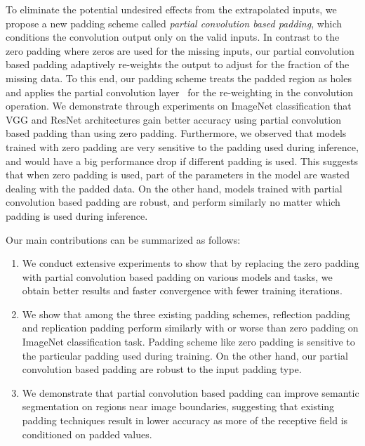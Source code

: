 \documentclass[10pt,twocolumn,letterpaper]{article}
\begin{document}
To eliminate the potential undesired effects from the extrapolated inputs, we propose a new padding scheme called \textit{partial convolution based padding}, which conditions the convolution output only on the valid inputs. In contrast to the zero padding where zeros are used for the missing inputs, our partial convolution based padding adaptively re-weights the output to adjust for the fraction of the missing data. To this end, our padding scheme treats the padded region as holes and applies the partial convolution layer~\cite{liu2018image} for the re-weighting in the convolution operation. We demonstrate through experiments on ImageNet classification that VGG and ResNet architectures gain better accuracy using partial convolution based padding than using zero padding.
Furthermore, we observed that models trained with zero padding are very sensitive to the padding used during inference, and would have a big performance drop if different padding is used. This suggests that when zero padding is used, part of the parameters in the model are wasted dealing with the padded data. On the other hand, models trained with partial convolution based padding are robust, and perform similarly no matter which padding is used during inference.

Our main contributions can be summarized as follows: 
\begin{enumerate}
\item We conduct extensive experiments to show that by replacing the zero padding with partial convolution based padding on various models and tasks, we obtain better results and faster convergence with fewer training iterations.
\item We show that among the three existing padding schemes, reflection padding and replication padding perform similarly with or worse than zero padding on ImageNet classification task. Padding scheme like zero padding is sensitive to the particular padding used during training. On the other hand, our partial convolution based padding are robust to the input padding type.
\item We demonstrate that partial convolution based padding can improve semantic segmentation on regions near image boundaries, suggesting that existing padding techniques result in lower accuracy as more of the receptive field is conditioned on padded values.
\end{enumerate}
\end{document}
